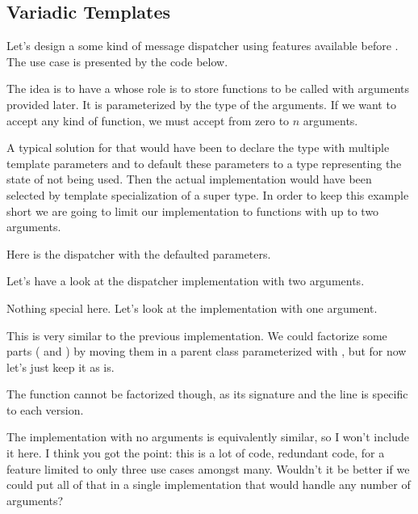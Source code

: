 \subsection{Variadic Templates}
\label{variadic-template}

\problemtitle

Let's design a some kind of message dispatcher using features
available before . The use case is presented by the code below.



The idea is to have a  whose role is to store
functions to be called with arguments provided later. It is
parameterized by the type of the arguments. If we want to accept any
kind of function, we must accept from zero to $n$ arguments.

A typical solution for that would have been to declare the type with
multiple template parameters and to default these parameters to a type
representing the state of not being used. Then the actual
implementation would have been selected by template specialization of
a super type. In order to keep this example short we are going to
limit our implementation to functions with up to two arguments.

Here is the dispatcher with the defaulted parameters.



Let's have a look at the dispatcher implementation with two arguments.



Nothing special here. Let's look at the implementation with one
argument.



This is very similar to the previous implementation. We could
factorize some parts ( and ) by
moving them in a parent class parameterized with
, but for now let's just keep it as is.

The  function cannot be factorized though, as its
signature and the  line is specific to
each version.

The implementation with no arguments is equivalently similar, so I
won't include it here. I think you got the point: this is a lot of
code, redundant code, for a feature limited to only three use cases
amongst many. Wouldn't it be better if we could put all of that in a
single implementation that would handle any number of arguments?

